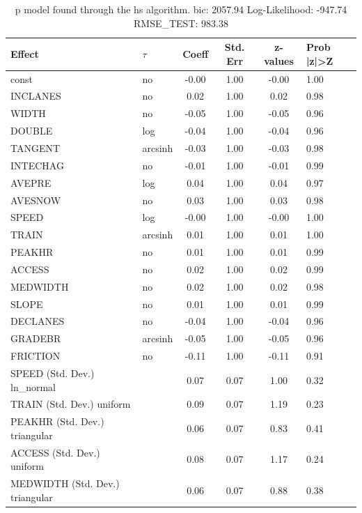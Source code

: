 \begin{table}
	\caption{p model found through the hs algorithm. bic: 2057.94 Log-Likelihood: -947.74 RMSE_TEST: 983.38}
	\begin{center}
		\begin{tabular}{|l|l|c|c|c|l|}
			\hline
			Effect & $\tau$ & Coeff & Std. Err & z-values & Prob |z|>Z \\
			\hline
			const & no & -0.00 & 1.00 & -0.00 & 1.00 \\
			\hline
			INCLANES & no & 0.02 & 1.00 & 0.02 & 0.98 \\
			\hline
			WIDTH & no & -0.05 & 1.00 & -0.05 & 0.96 \\
			\hline
			DOUBLE & log & -0.04 & 1.00 & -0.04 & 0.96 \\
			\hline
			TANGENT & arcsinh & -0.03 & 1.00 & -0.03 & 0.98 \\
			\hline
			INTECHAG & no & -0.01 & 1.00 & -0.01 & 0.99 \\
			\hline
			AVEPRE & log & 0.04 & 1.00 & 0.04 & 0.97 \\
			\hline
			AVESNOW & no & 0.03 & 1.00 & 0.03 & 0.98 \\
			\hline
			SPEED & log & -0.00 & 1.00 & -0.00 & 1.00 \\
			\hline
			TRAIN & arcsinh & 0.01 & 1.00 & 0.01 & 1.00 \\
			\hline
			PEAKHR & no & 0.01 & 1.00 & 0.01 & 0.99 \\
			\hline
			ACCESS & no & 0.02 & 1.00 & 0.02 & 0.99 \\
			\hline
			MEDWIDTH & no & 0.02 & 1.00 & 0.02 & 0.98 \\
			\hline
			SLOPE & no & 0.01 & 1.00 & 0.01 & 0.99 \\
			\hline
			DECLANES & no & -0.04 & 1.00 & -0.04 & 0.96 \\
			\hline
			GRADEBR & arcsinh & -0.05 & 1.00 & -0.05 & 0.96 \\
			\hline
			FRICTION & no & -0.11 & 1.00 & -0.11 & 0.91 \\
			\hline
			SPEED (Std. Dev.) ln_normal &  & 0.07 & 0.07 & 1.00 & 0.32 \\
			\hline
			TRAIN (Std. Dev.) uniform &  & 0.09 & 0.07 & 1.19 & 0.23 \\
			\hline
			PEAKHR (Std. Dev.) triangular &  & 0.06 & 0.07 & 0.83 & 0.41 \\
			\hline
			ACCESS (Std. Dev.) uniform &  & 0.08 & 0.07 & 1.17 & 0.24 \\
			\hline
			MEDWIDTH (Std. Dev.) triangular &  & 0.06 & 0.07 & 0.88 & 0.38 \\

\end{tabular}
\end{center}
\end{table}
